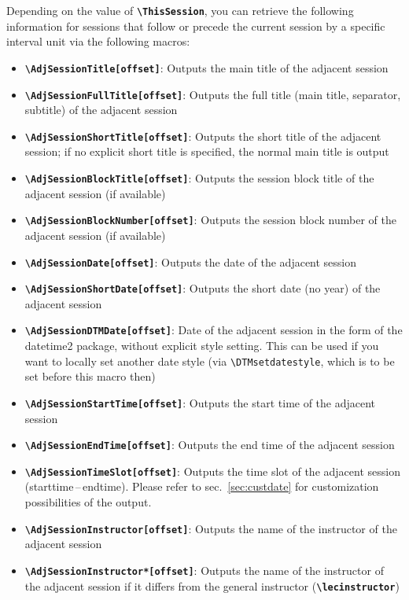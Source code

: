 \documentclass[english]{article}
\newcommand*\jmacro[1]{\textbf{\texttt{#1}}}
\newcommand*\jcsmacro[1]{\jmacro{\textbackslash{#1}}}
\newcommand*\jfmacro[1]{\texttt{#1}}
\newcommand*\jfcsmacro[1]{\jfmacro{\textbackslash{#1}}}
\newcommand*\jparam[1]{\angus #1\angud}
\begin{document}
Depending on the value of \jcsmacro{ThisSession}, you can retrieve the following
information for sessions that follow or precede the current session by a specific interval unit via the following macros:
\begin{itemize}
	\item \jcsmacro{AdjSessionTitle[\jparam{offset}]}: Outputs the main title
	of the adjacent session
	\item \jcsmacro{AdjSessionFullTitle[\jparam{offset}]}: Outputs the full
	title (main title, separator, subtitle) of the adjacent session
	\item \jcsmacro{AdjSessionShortTitle[\jparam{offset}]}: Outputs the short
	title of the adjacent session; if no explicit short title is specified, the normal main title is output
	\item \jcsmacro{AdjSessionBlockTitle[\jparam{offset}]}: Outputs the session block
	title of the adjacent session (if available)
	\item \jcsmacro{AdjSessionBlockNumber[\jparam{offset}]}: Outputs the session block
	number of the adjacent session (if available)
	\item \jcsmacro{AdjSessionDate[\jparam{offset}]}: Outputs the date of the adjacent session
	\item \jcsmacro{AdjSessionShortDate[\jparam{offset}]}: Outputs the short
	date (no year) of the adjacent session
	\item \jcsmacro{AdjSessionDTMDate[\jparam{offset}]}: Date of the adjacent session in the form of the
	\textsf{datetime2} package, without explicit style setting.
	This can be used if you want to locally set another
	date style (via \jfcsmacro{DTMsetdatestyle}, which is to be set before this macro then)
	\item \jcsmacro{AdjSessionStartTime[\jparam{offset}]}: Outputs the start time of the adjacent session
	\item \jcsmacro{AdjSessionEndTime[\jparam{offset}]}: Outputs the end time of the adjacent session
	\item \jcsmacro{AdjSessionTimeSlot[\jparam{offset}]}: Outputs the time slot of the adjacent session
	      (starttime\,--\,endtime). Please refer to	sec.~\ref{sec:custdate} for customization possibilities of the output.
	\item \jcsmacro{AdjSessionInstructor[\jparam{offset}]}: Outputs the name of the instructor of the adjacent session
	\item \jcsmacro{AdjSessionInstructor*[\jparam{offset}]}: Outputs the name of the instructor of the adjacent session if it differs from the general instructor (\jcsmacro{lecinstructor})

\end{itemize}
\end{document}
